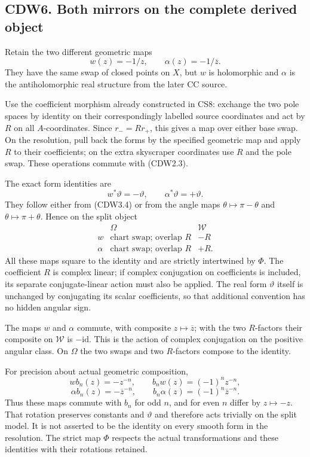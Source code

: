 \subsection{CDW6. Both mirrors on the complete derived
object}\label{cdw6.-both-mirrors-on-the-complete-derived-object}

Retain the two different geometric maps \[
w(z)=-1/z,\qquad
\alpha(z)=-1/\overline z.
\tag{CDW6.1}
\] They have the same swap of closed points on \(X\), but \(w\) is
holomorphic and \(\alpha\) is the antiholomorphic real structure from
the later CC source.

Use the coefficient morphism already constructed in CS8: exchange the
two pole spaces by identity on their correspondingly labelled source
coordinates and act by \(R\) on all \(A\)-coordinates. Since
\(r_-=Rr_+\), this gives a map over either base swap. On the resolution,
pull back the forms by the specified geometric map and apply \(R\) to
their coefficients; on the extra skyscraper coordinates use \(R\) and
the pole swap. These operations commute with (CDW2.3).

The exact form identities are \[
w^*\vartheta=-\vartheta,\qquad
\alpha^*\vartheta=+\vartheta.
\tag{CDW6.2}
\] They follow either from (CDW3.4) or from the angle maps
\(\theta\mapsto\pi-\theta\) and \(\theta\mapsto\pi+\theta\). Hence on
the split object \[
\begin{array}{c|cc}
&\Omega&\mathscr W\\ \hline
w&\text{chart swap; overlap }R&-R\\
\alpha&\text{chart swap; overlap }R&+R.
\end{array}
\tag{CDW6.3}
\] All these maps square to the identity and are strictly intertwined by
\(\Phi\). The coefficient \(R\) is complex linear; if complex
conjugation on coefficients is included, its separate conjugate-linear
action must also be applied. The real form \(\vartheta\) itself is
unchanged by conjugating its scalar coefficients, so that additional
convention has no hidden angular sign.

The maps \(w\) and \(\alpha\) commute, with composite
\(z\mapsto\overline z\); with the two \(R\)-factors their composite on
\(\mathscr W\) is \(-\mathrm{id}\). This is the action of complex
conjugation on the positive angular class. On \(\Omega\) the two swaps
and two \(R\)-factors compose to the identity.

For precision about actual geometric composition, \[
w b_n(z)=-z^{-n},\qquad b_n w(z)=(-1)^n z^{-n},
\] \[
\alpha b_n(z)=-\overline z^{-n},\qquad
b_n\alpha(z)=(-1)^n\overline z^{-n}.
\tag{CDW6.4}
\] Thus these maps commute with \(b_n\) for odd \(n\), and for even
\(n\) differ by \(z\mapsto-z\). That rotation preserves constants and
\(\vartheta\) and therefore acts trivially on the split model. It is not
asserted to be the identity on every smooth form in the resolution. The
strict map \(\Phi\) respects the actual transformations and these
identities with their rotations retained.

